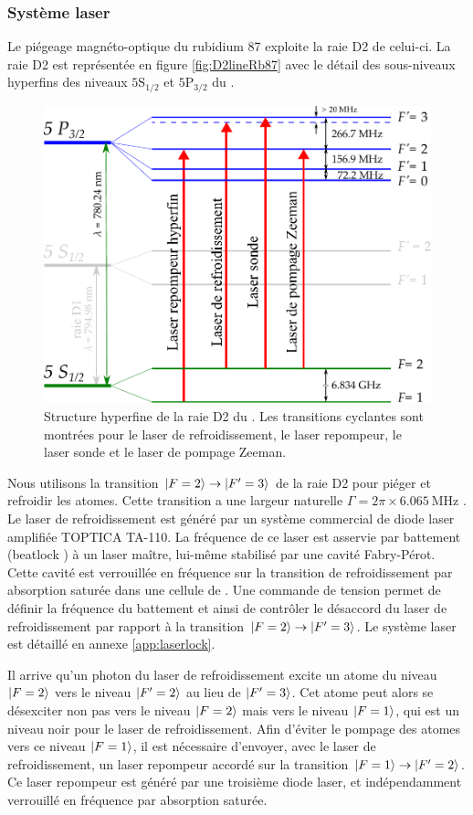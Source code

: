 \clearpage
\subsubsection*{Système laser}
\noindent Le piégeage magnéto-optique du rubidium 87 exploite la raie D2 de celui-ci.
La raie D2 est représentée en figure \eqref{fig:D2lineRb87} avec le détail des sous-niveaux hyperfins des niveaux $\mathrm{5S_{1/2}}$ et $\mathrm{5P_{3/2}}$ du .
%	
\begin{figure}[t]
\centering
\includegraphics[width=0.8\linewidth]{figures/setup/coldatoms/D2lineRb87}
\caption[Raie D2 du ]{Structure hyperfine de la raie D2 du .
Les transitions cyclantes sont montrées pour le laser de refroidissement, le laser repompeur, le laser sonde et le laser de pompage Zeeman.
}
\label{fig:D2lineRb87}
\end{figure}
%
Nous utilisons la transition $\ket{F=2} \rightarrow \ket{F'=3}$ de la raie D2 pour piéger et refroidir les atomes.
Cette transition a une largeur naturelle $\Gamma = 2\pi \times \SI{6.065}{\MHz}$ \cite{DATA_STECKRB87}.
Le laser de refroidissement est généré par un système commercial de diode laser amplifiée TOPTICA TA-110.
La fréquence de ce laser est asservie par battement (\og beatlock \fg{}) à un laser maître, lui-même stabilisé par une cavité Fabry-Pérot.
Cette cavité est verrouillée en fréquence sur la transition de refroidissement par absorption saturée dans une cellule de .
Une commande de tension permet de définir la fréquence du battement et ainsi de contrôler le désaccord du laser de refroidissement par rapport à la transition $\ket{F=2}\rightarrow\ket{F'=3}$.
Le système laser est détaillé en annexe \ref{app:laserlock}.

Il arrive qu'un photon du laser de refroidissement excite un atome du niveau $\ket{F=2}$ vers le niveau $\ket{F'=2}$ au lieu de $\ket{F'=3}$.
Cet atome peut alors se désexciter non pas vers le niveau $\ket{F=2}$ mais vers le niveau $\ket{F=1}$, qui est un niveau noir pour le laser de refroidissement.
Afin d'éviter le pompage des atomes vers ce niveau $\ket{F=1}$, il est nécessaire d'envoyer, avec le laser de refroidissement, un laser \og repompeur\fg{} accordé sur la transition $\ket{F=1}\rightarrow \ket{F'=2}$.
Ce laser repompeur est généré par une troisième diode laser, et indépendamment verrouillé en fréquence par absorption saturée.

